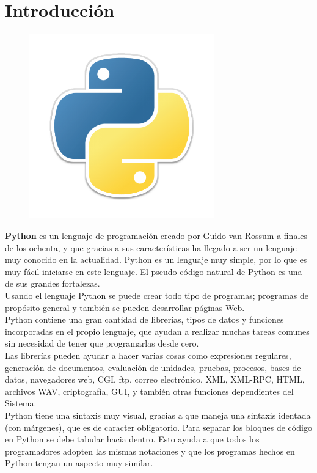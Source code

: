 \documentclass[a4paper,openright,12pt]{report}
\begin{document}
\chapter{Introducción}
\begin{figure}[htb]
\begin{center}
\includegraphics[width=8cm]{./imagenes/Python_Logo.png}
\end{center}
\end{figure}
\textbf{Python} es un lenguaje de programación creado por Guido van Rossum a finales de los ochenta, y que gracias a sus características ha llegado a ser un lenguaje muy conocido en la actualidad.
Python es un lenguaje muy simple, por lo que es muy fácil iniciarse en este lenguaje. El pseudo-código natural de Python es una de sus grandes fortalezas.\\

Usando el lenguaje Python se puede crear todo tipo de programas; programas de propósito general y también se pueden desarrollar páginas Web.\\

Python contiene una gran cantidad de librerías, tipos de datos y funciones incorporadas en el propio lenguaje, que ayudan a realizar muchas tareas comunes sin necesidad de tener que programarlas desde cero.\\
Las librerías pueden ayudar a hacer varias cosas como expresiones regulares, generación de documentos, evaluación de unidades, pruebas, procesos, bases de datos, navegadores web, CGI, ftp, correo electrónico, XML, XML-RPC, HTML, archivos WAV, criptografía, GUI, y también otras funciones dependientes del Sistema.\\

Python tiene una sintaxis muy visual, gracias a que maneja una sintaxis identada (con márgenes), que es de caracter obligatorio. Para separar los bloques de código en Python se debe tabular hacia dentro. Esto ayuda a que todos los programadores adopten las mismas notaciones y que los programas hechos en Python tengan un aspecto muy similar.\\
\end{document}
